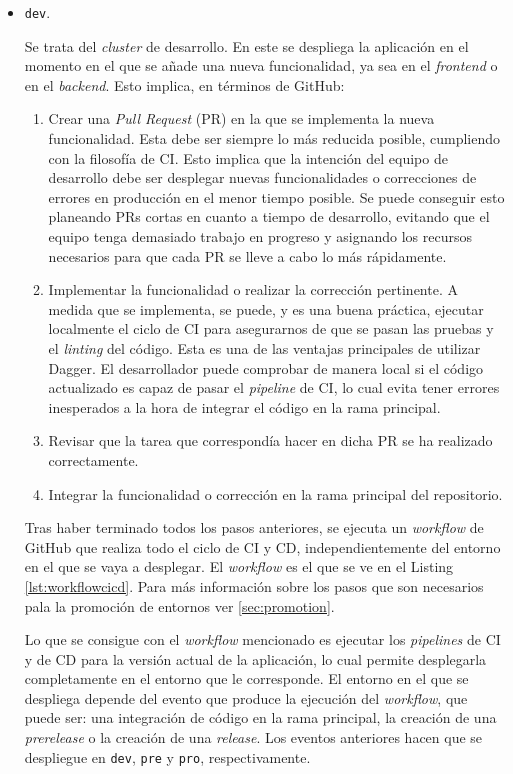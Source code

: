 \begin{itemize}
  \item \texttt{dev}.

    Se trata del \textit{cluster} de desarrollo. En este se despliega la aplicación en el momento en el que se añade una nueva funcionalidad, ya sea en el \textit{frontend} o en el \textit{backend}. Esto implica, en términos de GitHub:

    \begin{enumerate}
      \item Crear una \textit{Pull Request} (PR) en la que se implementa la nueva funcionalidad. Esta debe ser siempre lo más reducida posible, cumpliendo con la filosofía de CI. Esto implica que la intención del equipo de desarrollo debe ser desplegar nuevas funcionalidades o correcciones de errores en producción en el menor tiempo posible. Se puede conseguir esto planeando PRs cortas en cuanto a tiempo de desarrollo, evitando que el equipo tenga demasiado trabajo en progreso y asignando los recursos necesarios para que cada PR se lleve a cabo lo más rápidamente\cite{linear}.
      \item Implementar la funcionalidad o realizar la corrección pertinente. A medida que se implementa, se puede, y es una buena práctica, ejecutar localmente el ciclo de CI para asegurarnos de que se pasan las pruebas y el \textit{linting} del código. Esta es una de las ventajas principales de utilizar Dagger. El desarrollador puede comprobar de manera local si el código actualizado es capaz de pasar el \textit{pipeline} de CI, lo cual evita tener errores inesperados a la hora de integrar el código en la rama principal.
      \item Revisar que la tarea que correspondía hacer en dicha PR se ha realizado correctamente.
      \item Integrar la funcionalidad o corrección en la rama principal del repositorio.
    \end{enumerate}

    Tras haber terminado todos los pasos anteriores, se ejecuta un \textit{workflow} de GitHub que realiza todo el ciclo de CI y CD, independientemente del entorno en el que se vaya a desplegar. El \textit{workflow} es el que se ve en el Listing \ref{lst:workflowcicd}. Para más información sobre los pasos que son necesarios pala la promoción de entornos ver \ref{sec:promotion}. 

    Lo que se consigue con el \textit{workflow} mencionado es ejecutar los \textit{pipelines} de CI y de CD para la versión actual de la aplicación, lo cual permite desplegarla completamente en el entorno que le corresponde. El entorno en el que se despliega depende del evento que produce la ejecución del \textit{workflow}, que puede ser: una integración de código en la rama principal, la creación de una \textit{prerelease} o la creación de una \textit{release}. Los eventos anteriores hacen que se despliegue en \texttt{dev}, \texttt{pre} y \texttt{pro}, respectivamente.


\end{itemize}

